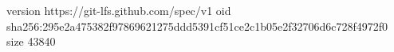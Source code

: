 version https://git-lfs.github.com/spec/v1
oid sha256:295e2a475382f97869621275ddd5391cf51ce2c1b05e2f32706d6c728f4972f0
size 43840
